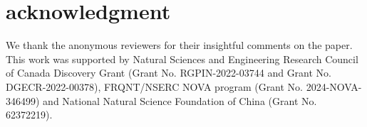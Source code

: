 \section{acknowledgment}
We thank the anonymous reviewers for their insightful comments on the paper.
This work was supported by Natural Sciences and Engineering Research Council of
Canada Discovery Grant (Grant No. RGPIN-2022-03744 and Grant No.
DGECR-2022-00378), FRQNT/NSERC NOVA program (Grant No. 2024-NOVA-346499) and National Natural Science Foundation of China (Grant No. 62372219).